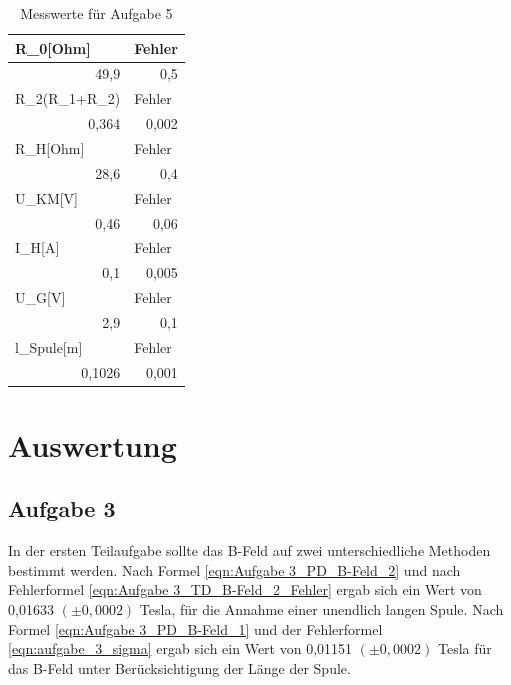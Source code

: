 \documentclass[12pt]{scrartcl}
\begin{document}
\begin{table}[htbp]
\caption{Messwerte für Aufgabe 5}
\begin{center}
\begin{tabular}{|l|l|}
\hline
R\_0[Ohm] & Fehler \\ \hline
\multicolumn{1}{|r|}{49,9} & \multicolumn{1}{r|}{0,5} \\ \hline
R\_2(R\_1+R\_2) & Fehler \\ \hline
\multicolumn{1}{|r|}{0,364} & \multicolumn{1}{r|}{0,002} \\ \hline
R\_H[Ohm] & Fehler \\ \hline
\multicolumn{1}{|r|}{28,6} & \multicolumn{1}{r|}{0,4} \\ \hline
U\_KM[V] & Fehler \\ \hline
\multicolumn{1}{|r|}{0,46} & \multicolumn{1}{r|}{0,06} \\ \hline
I\_H[A] & Fehler \\ \hline
\multicolumn{1}{|r|}{0,1} & \multicolumn{1}{r|}{0,005} \\ \hline
U\_G[V] & Fehler \\ \hline
\multicolumn{1}{|r|}{2,9} & \multicolumn{1}{r|}{0,1} \\ \hline
l\_Spule[m] & Fehler \\ \hline
\multicolumn{1}{|r|}{0,1026} & \multicolumn{1}{r|}{0,001} \\ \hline
\end{tabular}
\end{center}
\label{aufgabe_5}
\end{table}

\section{Auswertung}

\subsection{Aufgabe 3}
In der ersten Teilaufgabe sollte das B-Feld auf zwei unterschiedliche Methoden bestimmt werden.
Nach Formel \ref{eqn:Aufgabe 3_PD_B-Feld_2} und nach Fehlerformel \ref{eqn:Aufgabe 3_TD_B-Feld_2_Fehler} ergab sich ein Wert von 0,01633 $(\pm 0,0002)$ Tesla, für die Annahme einer unendlich langen Spule. Nach Formel \ref{eqn:Aufgabe 3_PD_B-Feld_1} und der Fehlerformel \ref{eqn:aufgabe_3_sigma} ergab sich ein Wert von 0,01151 $(\pm 0,0002)$ Tesla für das B-Feld unter Berücksichtigung der Länge der Spule.
\end{document}
